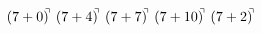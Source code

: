 \documentclass[preview]{standalone}
\begin{document}
\begin{align*}
(7+0)^{\hspace{-0.1cm}\urcorner} \ (7+4)^{\hspace{-0.1cm}\urcorner} \ (7+7)^{\hspace{-0.1cm}\urcorner} \ (7+10)^{\hspace{-0.1cm}\urcorner} \ (7+2)^{\hspace{-0.1cm}\urcorner}
\end{align*}
\end{document}
